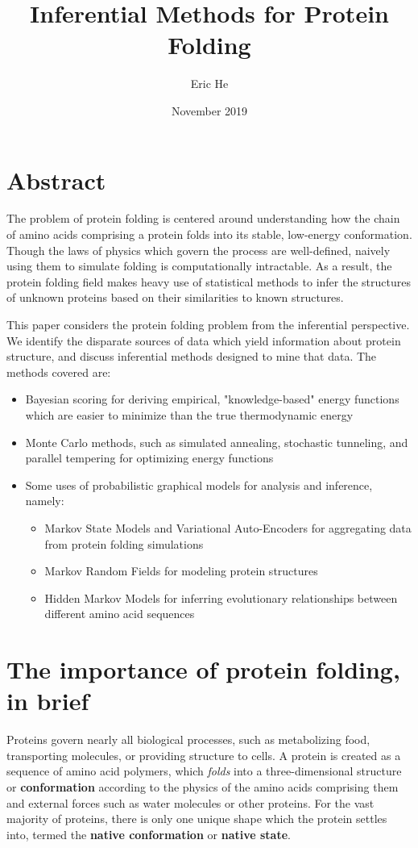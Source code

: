 \documentclass{article}
\title{Inferential Methods for Protein Folding}
\author{Eric He}
\date{November 2019}
\begin{document}
\maketitle

\section*{Abstract}
The problem of protein folding is centered around understanding how the chain of amino acids comprising a protein folds into its stable, low-energy conformation. Though the laws of physics which govern the process are well-defined, naively using them to simulate folding is computationally intractable. As a result, the protein folding field makes heavy use of statistical methods to infer the structures of unknown proteins based on their similarities to known structures. 

This paper considers the protein folding problem from the inferential perspective. We identify the disparate sources of data which yield information about protein structure, and discuss inferential methods designed to mine that data. The methods covered are:

\begin{itemize}
    \item Bayesian scoring for deriving empirical, "knowledge-based" energy functions which are easier to minimize than the true thermodynamic energy
    \item Monte Carlo methods, such as simulated annealing, stochastic tunneling, and parallel tempering for optimizing energy functions
    \item Some uses of probabilistic graphical models for analysis and inference, namely:
    \begin{itemize}
        \item Markov State Models and Variational Auto-Encoders for aggregating data from protein folding simulations
        \item Markov Random Fields for modeling protein structures
        \item Hidden Markov Models for inferring evolutionary relationships between different amino acid sequences
    \end{itemize}
\end{itemize}

\newpage
\tableofcontents
\newpage

\section{The importance of protein folding, in brief}
Proteins govern nearly all biological processes, such as metabolizing food, transporting molecules, or providing structure to cells. A protein is created as a sequence of amino acid polymers, which \textit{folds} into a three-dimensional structure or \textbf{conformation} according to the physics of the amino acids comprising them and external forces such as water molecules or other proteins. For the vast majority of proteins, there is only one unique shape which the protein settles into, termed the \textbf{native conformation} or \textbf{native state}.
\end{document}
